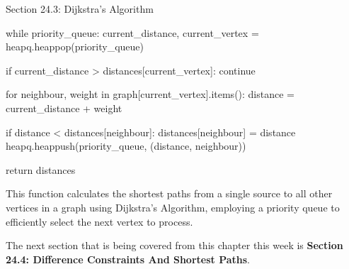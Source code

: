\begin{notes}{Section 24.3: Dijkstra's Algorithm}
\begin{highlight}
\begin{code}[Python]
        while priority_queue:
            current_distance, current_vertex = heapq.heappop(priority_queue)
    
            if current_distance > distances[current_vertex]:
                continue
    
            for neighbour, weight in graph[current_vertex].items():
                distance = current_distance + weight
    
                if distance < distances[neighbour]:
                    distances[neighbour] = distance
                    heapq.heappush(priority_queue, (distance, neighbour))
    
        return distances
    \end{code}
    This function calculates the shortest paths from a single source to all other vertices in a graph using Dijkstra's Algorithm, employing a priority queue to efficiently select the next vertex to process.
    \end{highlight}    
\end{notes}

The next section that is being covered from this chapter this week is \textbf{Section 24.4: Difference Constraints And Shortest Paths}.


